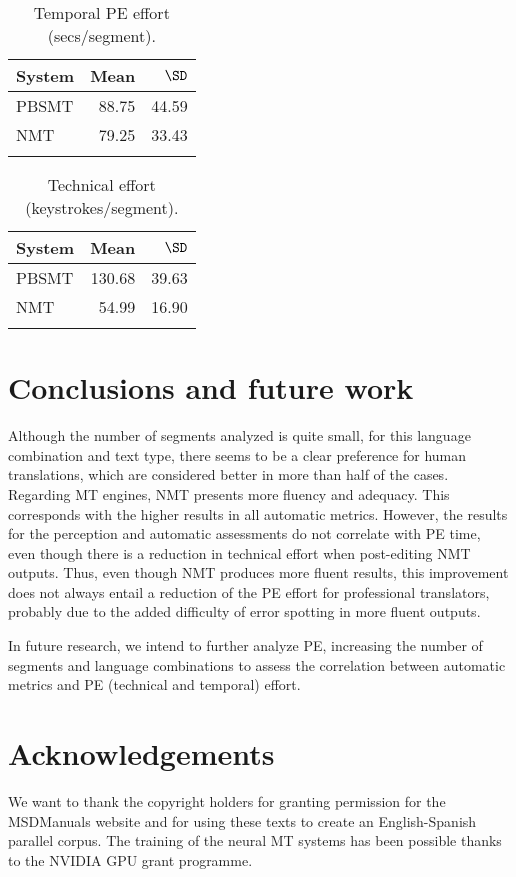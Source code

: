 \documentclass[output=paper]{langsci/langscibook}
\begin{document}
\begin{table}
\begin{tabularx}{.66\textwidth}{Xrr}
\lsptoprule
{System} & {Mean} & $\SD$\\
\midrule
PBSMT & 88.75 & 44.59\\
NMT & 79.25 & 33.43\\
\lspbottomrule
\end{tabularx}
\caption{\label{temporal post-editing} Temporal PE effort (secs/segment).}
\end{table}

\begin{table}
\begin{tabularx}{.66\textwidth}{Xrr}
\lsptoprule
{System} & {Mean} & $\SD$\\
\midrule
PBSMT & 130.68 & 39.63\\
NMT & 54.99 & 16.90\\
\lspbottomrule
\end{tabularx}
\caption{\label{technical post-editing} Technical effort (keystrokes/segment).}
\end{table}

\section{Conclusions and future work} \label{Conclusionsandfuturework}
Although the number of segments analyzed is quite small, for this language combination and text type, there seems to be a clear preference for human translations, which are considered better in more than half of the cases. Regarding MT engines, NMT presents more fluency and adequacy. This corresponds with the higher results in all automatic metrics. However, the results for the perception and automatic assessments do not correlate with PE time, even though there is a reduction in technical effort when post-editing NMT outputs. Thus, even though NMT produces more fluent results, this improvement does not always entail a reduction of the PE effort for professional translators, probably due to the added difficulty of error spotting in more fluent outputs.

In future research, we intend to further analyze PE, increasing the number of segments and language combinations to assess the correlation between automatic metrics and PE (technical and temporal) effort.


\section*{Acknowledgements}
We want to thank the copyright holders for granting permission for the MSDManuals website and for using these texts to create an English-Spanish parallel corpus. The training of the neural MT systems has been possible thanks to the NVIDIA GPU grant programme.

{\sloppy\printbibliography[heading=subbibliography,notkeyword=this]}
\end{document}
